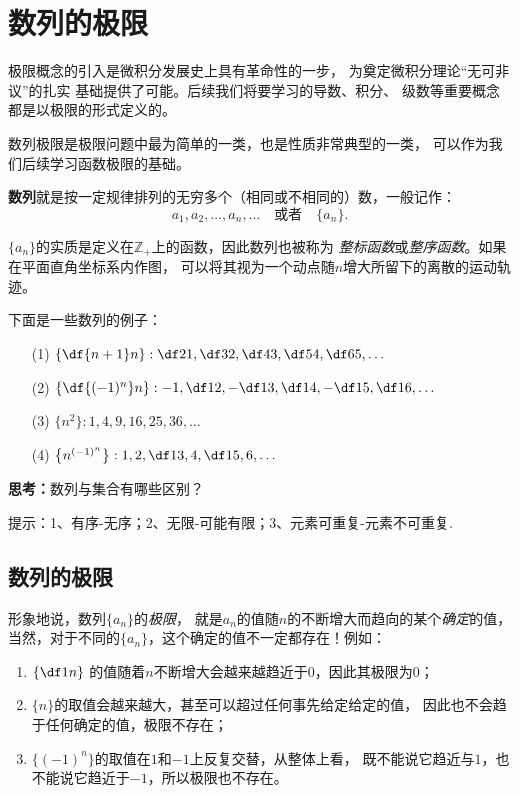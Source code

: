 \section{数列的极限}

极限概念的引入是微积分发展史上具有革命性的一步，
为奠定微积分理论“无可非议”的扎实
基础提供了可能。后续我们将要学习的导数、积分、
级数等重要概念都是以极限的形式定义的。

数列极限是极限问题中最为简单的一类，也是性质非常典型的一类，
可以作为我们后续学习函数极限的基础。

\bs
{\bf 数列}就是按一定规律排列的无穷多个（相同或不相同的）数，一般记作：
$$a_1,a_2,\ldots,a_n,\ldots\quad\mbox{或者}\quad\{a_n\}.$$

$\{a_n\}$的实质是定义在$\mathbb{Z}_+$上的函数，因此数列也被称为
{\it 整标函数}或{\it 整序函数}。如果在平面直角坐标系内作图，
可以将其视为一个动点随$n$增大所留下的离散的运动轨迹。

下面是一些数列的例子：
\begin{enumerate}[(1)]
  \setlength{\itemindent}{1cm}
  \item[(1)] $\left\{\df{n+1}n\right\}:\df 21,\df 32,\df43,\df54,\df65,\ldots$
  \item[(2)] $\left\{\df{(-1)^n}n\right\}:-1,\df12,-\df13,\df14,-\df15,\df16,\ldots$
  \item[(3)] $\{n^2\}:1,4,9,16,25,36,\ldots$
  \item[(4)] $\left\{n^{(-1)^n}\right\}:1,2,\df13,4,\df15,6,\ldots$
\end{enumerate}

\bs
{\bf 思考：}数列与集合有哪些区别？

\ifhint
提示：1、有序-无序；2、无限-可能有限；3、元素可重复-元素不可重复.
\fi

\subsection{数列的极限}

形象地说，数列$\{a_n\}$的{\it 极限}，
就是$a_n$的值随$n$的不断增大而趋向的某个{\it 确定}的值，
当然，对于不同的$\{a_n\}$，这个确定的值不一定都存在！例如：
\begin{enumerate}[(1)]
  \setlength{\itemindent}{1cm}
  \item $\left\{\df1n\right\}$
  的值随着$n$不断增大会越来越趋近于$0$，因此其极限为$0$；
  \item $\{n\}$的取值会越来越大，甚至可以超过任何事先给定给定的值，
  因此也不会趋于任何确定的值，极限不存在；
  \item $\{(-1)^n\}$的取值在$1$和$-1$上反复交替，从整体上看，
  既不能说它趋近与$1$，也不能说它趋近于$-1$，所以极限也不存在。
\end{enumerate}

